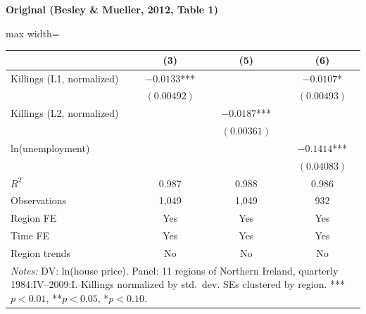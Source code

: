 \documentclass[11pt,a4paper]{article}
\begin{document}
\vspace{0.5cm}
\begin{minipage}[t]{0.48\textwidth}
\centering
\textbf{\large Original (Besley \& Mueller, 2012, Table 1)}
\vspace{0.3cm}

\begin{adjustbox}{max width=\textwidth}
\begin{tabular}{lccc}
\toprule
 & (3) & (5) & (6) \\
\midrule
Killings (L1, normalized) & $-0.0133$*** & & $-0.0107$* \\
 & $(0.00492)$ & & $(0.00493)$ \\[0.3em]
Killings (L2, normalized) & & $-0.0187$*** & \\
 & & $(0.00361)$ & \\[0.3em]
ln(unemployment) & & & $-0.1414$*** \\
 & & & $(0.04083)$ \\[0.3em]
\midrule
$R^2$ & 0.987 & 0.988 & 0.986 \\
Observations & 1,049 & 1,049 & 932 \\
Region FE & Yes & Yes & Yes \\
Time FE & Yes & Yes & Yes \\
Region trends & No & No & No \\
\bottomrule
\multicolumn{4}{p{0.95\textwidth}}{\footnotesize\textit{Notes:} DV: ln(house price). Panel: 11 regions of Northern Ireland, quarterly 1984:IV--2009:I. Killings normalized by std.\ dev. SEs clustered by region. ***$p<0.01$, **$p<0.05$, *$p<0.10$.}
\end{tabular}
\end{adjustbox}
\end{minipage}%
\hfill
\end{document}
